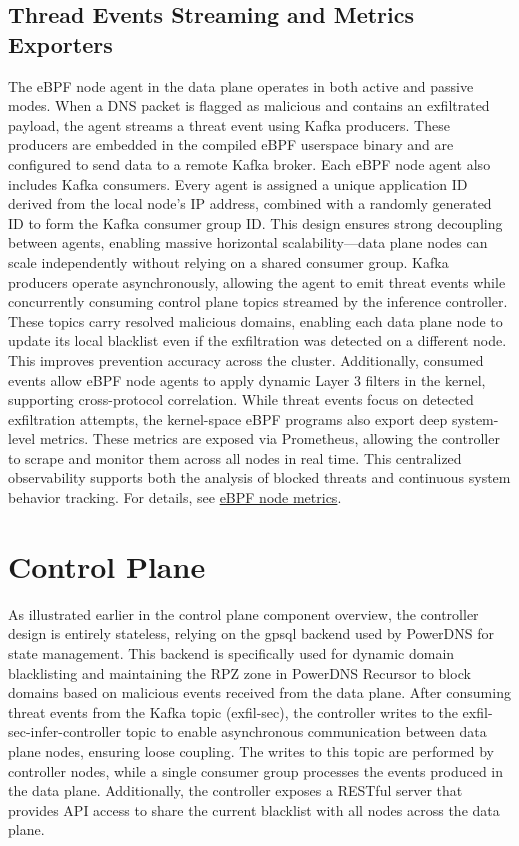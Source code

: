 \documentclass [11pt, proquest] {uwthesis}[2020/02/24]
\begin{document}
\subsection{Thread Events Streaming and Metrics Exporters}
The eBPF node agent in the data plane operates in both active and passive modes. When a DNS packet is flagged as malicious and contains an exfiltrated payload, the agent streams a threat event using Kafka producers. These producers are embedded in the compiled eBPF userspace binary and are configured to send data to a remote Kafka broker. Each eBPF node agent also includes Kafka consumers. Every agent is assigned a unique application ID derived from the local node’s IP address, combined with a randomly generated ID to form the Kafka consumer group ID. This design ensures strong decoupling between agents, enabling massive horizontal scalability—data plane nodes can scale independently without relying on a shared consumer group. Kafka producers operate asynchronously, allowing the agent to emit threat events while concurrently consuming control plane topics streamed by the inference controller. These topics carry resolved malicious domains, enabling each data plane node to update its local blacklist even if the exfiltration was detected on a different node. This improves prevention accuracy across the cluster. Additionally, consumed events allow eBPF node agents to apply dynamic Layer 3 filters in the kernel, supporting cross-protocol correlation. While threat events focus on detected exfiltration attempts, the kernel-space eBPF programs also export deep system-level metrics. These metrics are exposed via Prometheus, allowing the controller to scrape and monitor them across all nodes in real time. This centralized observability supports both the analysis of blocked threats and continuous system behavior tracking. For details, see \hyperref[sec:dp_ebpf_node_metrics]{eBPF node metrics}.

\section{Control Plane}
As illustrated earlier in the control plane component overview, the controller design is entirely stateless, relying on the gpsql backend used by PowerDNS for state management. This backend is specifically used for dynamic domain blacklisting and maintaining the RPZ zone in PowerDNS Recursor to block domains based on malicious events received from the data plane. After consuming threat events from the Kafka topic (exfil-sec), the controller writes to the exfil-sec-infer-controller topic to enable asynchronous communication between data plane nodes, ensuring loose coupling. The writes to this topic are performed by controller nodes, while a single consumer group processes the events produced in the data plane. Additionally, the controller exposes a RESTful server that provides API access to share the current blacklist with all nodes across the data plane.
\end{document}
